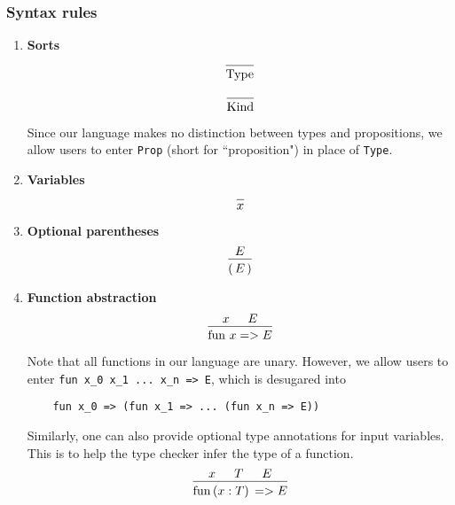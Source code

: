 \documentclass{article}
\begin{document}
\subsubsection{Syntax rules}
\begin{enumerate}
\item \textbf{Sorts} \\
  \[
    \begin{prooftree}
      \infer0{\Type}
    \end{prooftree}
  \]

  \[
    \begin{prooftree}
      \infer0{\Kind}
    \end{prooftree}
  \]

  Since our language makes no distinction between types and propositions,
  we allow users to enter \verb|Prop| (short for ``proposition") in place of 
  \verb|Type|.

\item \textbf{Variables} \\
  \[
    \begin{prooftree}
      \infer0{x}
    \end{prooftree}
  \]

\item \textbf{Optional parentheses} \\
  \[
    \begin{prooftree}
      \hypo{E}
      \infer1{( \, E \, )}
    \end{prooftree}
  \]
  
\item \textbf{Function abstraction} \\
  \[
    \begin{prooftree}
      \hypo{x}
      \hypo{E}
      \infer2{\fun \, x => E}
    \end{prooftree}
  \]

  Note that all functions in our language are unary. However, we allow users
  to enter \verb|fun x_0 x_1 ... x_n => E|, which is desugared into
  \begin{verbatim}
    fun x_0 => (fun x_1 => ... (fun x_n => E))
  \end{verbatim}

  Similarly, one can also provide optional type annotations for input variables.
  This is to help the type checker infer the type of a function.
  \[
    \begin{prooftree}
      \hypo{x}
      \hypo{T}
      \hypo{E}
      \infer3{\fun \, (x : T) \, => E}
    \end{prooftree}
  \]


\end{enumerate}
\end{document}
